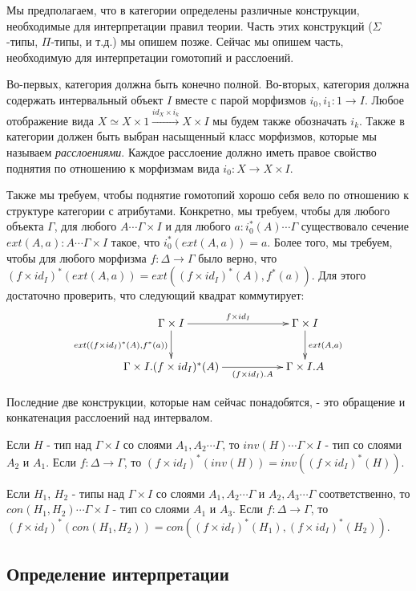 \documentclass{amsart}
\theoremstyle{definition}
\theoremstyle{remark}
\numberwithin{figure}{section}
\begin{document}
Мы предполагаем, что в категории определены различные конструкции, необходимые для интерпретации правил теории.
Часть этих конструкций ($\Sigma$-типы, $\Pi$-типы, и т.д.) мы опишем позже.
Сейчас мы опишем часть, необходимую для интерпретации гомотопий и расслоений.

Во-первых, категория должна быть конечно полной.
Во-вторых, категория должна содержать интервальный объект $I$ вместе с парой морфизмов $i_0, i_1 : 1 \to I$.
Любое отображение вида $X \simeq X \times 1 \xrightarrow{id_X \times i_k} X \times I$ мы будем также обозначать $i_k$.
Также в категории должен быть выбран насыщенный класс морфизмов, которые мы называем \emph{расслоениями}.
Каждое расслоение должно иметь правое свойство поднятия по отношению к морфизмам вида $i_0 : X \to X \times I$.

Также мы требуем, чтобы поднятие гомотопий хорошо себя вело по отношению к структуре категории с атрибутами.
Конкретно, мы требуем, чтобы для любого объекта $\Gamma$, для любого $A \dotsb \Gamma \times I$ и для любого $a : i_0^*(A) \dotsb \Gamma$ существовало сечение $ext(A,a) : A \dotsb \Gamma \times I$ такое, что $i_0^*(ext(A,a)) = a$.
Более того, мы требуем, чтобы для любого морфизма $f : \Delta \to \Gamma$ было верно, что $(f \times id_I)^*(ext(A,a)) = ext((f \times id_I)^*(A), f^*(a))$.
Для этого достаточно проверить, что следующий квадрат коммутирует:
\[ \xymatrix{ \Gamma \times I \ar[rr]^{f \times id_I} \ar[d]_{ext((f \times id_I)^*(A), f^*(a))} & & \Gamma \times I \ar[d]^{ext(A,a)} \\
              \Gamma \times I.(f \times id_I)^*(A) \ar[rr]_-{(f \times id_I).A}                  & & \Gamma \times I.A
            } \]

Последние две конструкции, которые нам сейчас понадобятся, - это обращение и конкатенация расслоений над интервалом.

Если $H$ - тип над $\Gamma \times I$ со слоями $A_1, A_2 \dotsb \Gamma$, то $inv(H) \dotsb \Gamma \times I$ - тип со слоями $A_2$ и $A_1$.
Если $f : \Delta \to \Gamma$, то $(f \times id_I)^*(inv(H)) = inv((f \times id_I)^*(H))$.

Если $H_1$, $H_2$ - типы над $\Gamma \times I$ со слоями $A_1, A_2 \dotsb \Gamma$ и $A_2, A_3 \dotsb \Gamma$ соответственно, то $con(H_1, H_2) \dotsb \Gamma \times I$ - тип со слоями $A_1$ и $A_3$.
Если $f : \Delta \to \Gamma$, то $(f \times id_I)^*(con(H_1, H_2)) = con((f \times id_I)^*(H_1), (f \times id_I)^*(H_2))$.

\subsection{Определение интерпретации}
\end{document}
